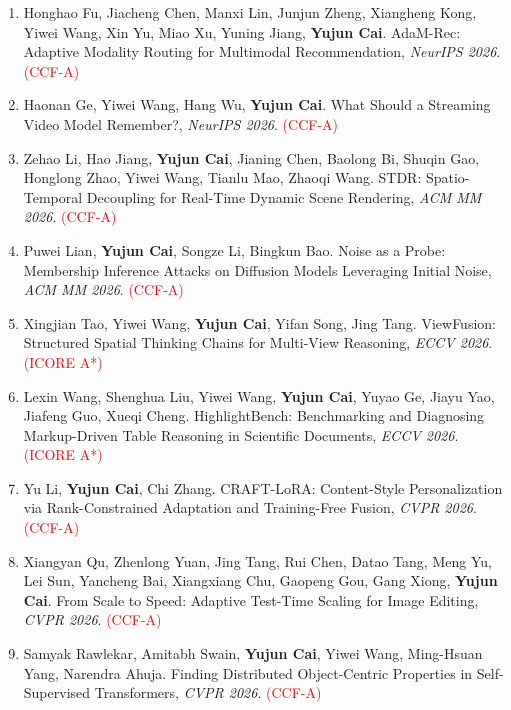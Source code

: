 \documentclass[UTF8,a4paper,11pt,fontset=fandol]{ctexart}
\begin{document}
\begin{enumerate}
\item Honghao Fu, Jiacheng Chen, Manxi Lin, Junjun Zheng, Xiangheng Kong, Yiwei Wang, Xin Yu, Miao Xu, Yuning Jiang, \textbf{Yujun Cai}. AdaM-Rec: Adaptive Modality Routing for Multimodal Recommendation, \textit{NeurIPS 2026}. \textcolor{red}{(CCF-A)}

\item Haonan Ge, Yiwei Wang, Hang Wu, \textbf{Yujun Cai}. What Should a Streaming Video Model Remember?, \textit{NeurIPS 2026}. \textcolor{red}{(CCF-A)}

\item Zehao Li, Hao Jiang, \textbf{Yujun Cai}, Jianing Chen, Baolong Bi, Shuqin Gao, Honglong Zhao, Yiwei Wang, Tianlu Mao, Zhaoqi Wang. STDR: Spatio-Temporal Decoupling for Real-Time Dynamic Scene Rendering, \textit{ACM MM 2026}. \textcolor{red}{(CCF-A)}

\item Puwei Lian, \textbf{Yujun Cai}, Songze Li, Bingkun Bao. Noise as a Probe: Membership Inference Attacks on Diffusion Models Leveraging Initial Noise, \textit{ACM MM 2026}. \textcolor{red}{(CCF-A)}

\item Xingjian Tao, Yiwei Wang, \textbf{Yujun Cai}, Yifan Song, Jing Tang. ViewFusion: Structured Spatial Thinking Chains for Multi-View Reasoning, \textit{ECCV 2026}. \textcolor{red}{(ICORE A*)}

\item Lexin Wang, Shenghua Liu, Yiwei Wang, \textbf{Yujun Cai}, Yuyao Ge, Jiayu Yao, Jiafeng Guo, Xueqi Cheng. HighlightBench: Benchmarking and Diagnosing Markup-Driven Table Reasoning in Scientific Documents, \textit{ECCV 2026}. \textcolor{red}{(ICORE A*)}

\item Yu Li, \textbf{Yujun Cai}, Chi Zhang. CRAFT-LoRA: Content-Style Personalization via Rank-Constrained Adaptation and Training-Free Fusion, \textit{CVPR 2026}. \textcolor{red}{(CCF-A)}

\item Xiangyan Qu, Zhenlong Yuan, Jing Tang, Rui Chen, Datao Tang, Meng Yu, Lei Sun, Yancheng Bai, Xiangxiang Chu, Gaopeng Gou, Gang Xiong, \textbf{Yujun Cai}. From Scale to Speed: Adaptive Test-Time Scaling for Image Editing, \textit{CVPR 2026}. \textcolor{red}{(CCF-A)}

\item Samyak Rawlekar, Amitabh Swain, \textbf{Yujun Cai}, Yiwei Wang, Ming-Hsuan Yang, Narendra Ahuja. Finding Distributed Object-Centric Properties in Self-Supervised Transformers, \textit{CVPR 2026}. \textcolor{red}{(CCF-A)}


\end{enumerate}
\end{document}
